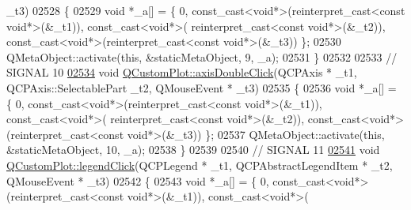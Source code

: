 \begin{DoxyCode}
       \_t3)
02528 \{
02529     \textcolor{keywordtype}{void} *\_a[] = \{ 0, \textcolor{keyword}{const\_cast<}\textcolor{keywordtype}{void}*\textcolor{keyword}{>}(\textcolor{keyword}{reinterpret\_cast<}\textcolor{keyword}{const }\textcolor{keywordtype}{void}*\textcolor{keyword}{>}(&\_t1)), \textcolor{keyword}{const\_cast<}\textcolor{keywordtype}{void}*\textcolor{keyword}{>}(\textcolor{keyword}{
      reinterpret\_cast<}\textcolor{keyword}{const }\textcolor{keywordtype}{void}*\textcolor{keyword}{>}(&\_t2)), \textcolor{keyword}{const\_cast<}\textcolor{keywordtype}{void}*\textcolor{keyword}{>}(\textcolor{keyword}{reinterpret\_cast<}\textcolor{keyword}{const }\textcolor{keywordtype}{void}*\textcolor{keyword}{>}(&\_t3)) \};
02530     QMetaObject::activate(\textcolor{keyword}{this}, &staticMetaObject, 9, \_a);
02531 \}
02532 
02533 \textcolor{comment}{// SIGNAL 10}
\hypertarget{a00067_source_l02534}{}\hyperlink{a00116_a6df35357460181a72da3e93d600f5256}{02534} \textcolor{keywordtype}{void} \hyperlink{a00116_a6df35357460181a72da3e93d600f5256}{QCustomPlot::axisDoubleClick}(QCPAxis * \_t1, QCPAxis::SelectablePart \_t2, 
      QMouseEvent * \_t3)
02535 \{
02536     \textcolor{keywordtype}{void} *\_a[] = \{ 0, \textcolor{keyword}{const\_cast<}\textcolor{keywordtype}{void}*\textcolor{keyword}{>}(\textcolor{keyword}{reinterpret\_cast<}\textcolor{keyword}{const }\textcolor{keywordtype}{void}*\textcolor{keyword}{>}(&\_t1)), \textcolor{keyword}{const\_cast<}\textcolor{keywordtype}{void}*\textcolor{keyword}{>}(\textcolor{keyword}{
      reinterpret\_cast<}\textcolor{keyword}{const }\textcolor{keywordtype}{void}*\textcolor{keyword}{>}(&\_t2)), \textcolor{keyword}{const\_cast<}\textcolor{keywordtype}{void}*\textcolor{keyword}{>}(\textcolor{keyword}{reinterpret\_cast<}\textcolor{keyword}{const }\textcolor{keywordtype}{void}*\textcolor{keyword}{>}(&\_t3)) \};
02537     QMetaObject::activate(\textcolor{keyword}{this}, &staticMetaObject, 10, \_a);
02538 \}
02539 
02540 \textcolor{comment}{// SIGNAL 11}
\hypertarget{a00067_source_l02541}{}\hyperlink{a00116_a79cff0baafbca10a3aaf694d2d3b9ab3}{02541} \textcolor{keywordtype}{void} \hyperlink{a00116_a79cff0baafbca10a3aaf694d2d3b9ab3}{QCustomPlot::legendClick}(QCPLegend * \_t1, QCPAbstractLegendItem * \_t2, 
      QMouseEvent * \_t3)
02542 \{
02543     \textcolor{keywordtype}{void} *\_a[] = \{ 0, \textcolor{keyword}{const\_cast<}\textcolor{keywordtype}{void}*\textcolor{keyword}{>}(\textcolor{keyword}{reinterpret\_cast<}\textcolor{keyword}{const }\textcolor{keywordtype}{void}*\textcolor{keyword}{>}(&\_t1)), \textcolor{keyword}{const\_cast<}\textcolor{keywordtype}{void}*\textcolor{keyword}{>}(\textcolor{keyword}{
}
\end{DoxyCode}
